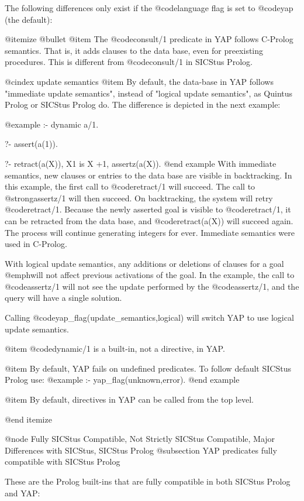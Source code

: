 {{{{{{{{{The following differences only exist if the @code{language} flag is set
to @code{yap} (the default):

@itemize @bullet
@item The @code{consult/1} predicate in YAP follows C-Prolog
semantics. That is, it adds clauses to the data base, even for
preexisting procedures. This is different from @code{consult/1} in
SICStus Prolog.

@cindex update semantics
@item By default, the data-base in YAP follows "immediate update
semantics", instead of "logical update semantics", as Quintus Prolog or
SICStus Prolog do. The difference is depicted in the next example:

@example
:- dynamic a/1.

?- assert(a(1)).

?- retract(a(X)), X1 is X +1, assertz(a(X)).
@end example
With immediate semantics, new clauses or entries to the data base are
visible in backtracking. In this example, the first call to
@code{retract/1} will succeed. The call to @strong{assertz/1} will then
succeed. On backtracking, the system will retry
@code{retract/1}. Because the newly asserted goal is visible to
@code{retract/1}, it can be retracted from the data base, and
@code{retract(a(X))} will succeed again. The process will continue
generating integers for ever. Immediate semantics were used in C-Prolog.

With logical update semantics, any additions or deletions of clauses
for a goal @emph{will not affect previous activations of the
goal}. In the example, the call to @code{assertz/1} will not see the
update performed by the @code{assertz/1}, and the query will have a
single solution.

Calling @code{yap_flag(update_semantics,logical)} will switch
YAP to use logical update semantics.

@item @code{dynamic/1} is a built-in, not a directive, in YAP.

@item By default, YAP fails on undefined predicates. To follow default
SICStus Prolog use:
@example
:- yap_flag(unknown,error).
@end example

@item By default, directives in YAP can be called from the top level.

@end itemize

@node Fully SICStus Compatible, Not Strictly SICStus Compatible, Major Differences with SICStus, SICStus Prolog
@subsection YAP predicates fully compatible with SICStus Prolog

These are the Prolog built-ins that are fully compatible in both SICStus
Prolog and YAP:

}}}}}}}}}
